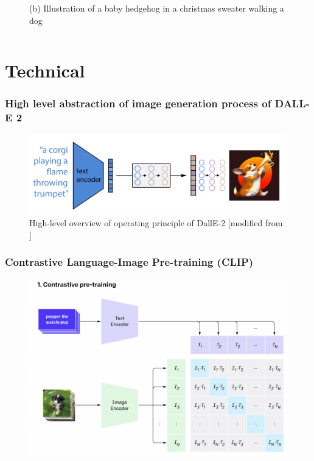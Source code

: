 \documentclass[
	11pt, compress%
]{beamer}
\begin{document}
\begin{frame}
\begin{columns}[c]
\begin{column}{0.5\textwidth}
\begin{figure}
				\caption{(b) Illustration of a baby hedgehog in a christmas sweater walking a dog \cite{DBLP:journals/corr/abs-2102-12092}} 
			\end{figure}
		\end{column}
	\end{columns}
\end{frame}


\section{Technical}

\begin{frame}
	\frametitle{High level abstraction of image generation process of DALL-E 2}
	\begin{figure}
		\includegraphics[width=0.85\linewidth]{Images/highLevel.png}
		\caption{High-level overview of operating principle of DallE-2 [modified from \cite{https://doi.org/10.48550/arxiv.2204.06125}]}
	\end{figure}
\end{frame}

\begin{frame}
	\frametitle{Contrastive Language-Image Pre-training (CLIP)}
	\begin{figure}
		\includegraphics[width=0.83\linewidth]{Images/CLIP1.png}
		\cite{CLIP}
	\end{figure}
\end{frame}
\end{document}
